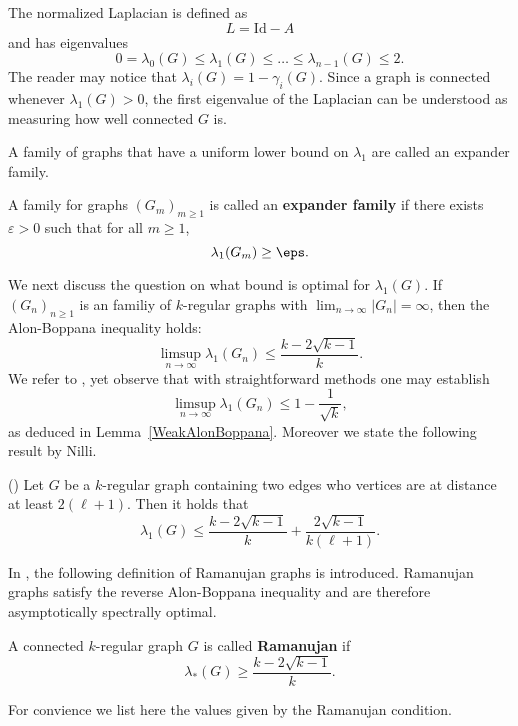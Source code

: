 The normalized Laplacian is defined as $$L = \mathrm{Id} - A$$ and has eigenvalues $$0 = \lambda_0(G) \leq \lambda_1(G) \leq \ldots \leq \lambda_{n-1}(G) \leq 2.$$ The reader may notice that $\lambda_i(G) = 1-\gamma_i(G)$. Since a graph is connected whenever $\lambda_1(G) > 0$, the first eigenvalue of the Laplacian can be understood as measuring how well connected $G$ is. 

A family of graphs that have a uniform lower bound on $\lambda_1$  are called an expander family.

\begin{definition}
	A family for graphs $(G_m)_{m \geq 1}$ is called an \textbf{expander family} if there exists $\varepsilon > 0$ such that for all $m \geq 1$, $$\lambda_1(G_m) \geq \eps.$$
\end{definition}

We next discuss the question on what bound is optimal for $\lambda_1(G)$. If $(G_n)_{n \geq 1}$ is an familiy of $k$-regular graphs with $\lim_{n \to \infty}|G_n| = \infty$, then the Alon-Boppana inequality holds: $$\limsup_{n \to \infty} \lambda_1(G_n) \leq \frac{k - 2\sqrt{k-1}}{k}.$$ We refer to \cite{HooryLinialWidgerson2006}, yet observe that with straightforward methods one may establish $$\limsup_{n \to \infty} \lambda_{1}(G_n) \leq 1 - \frac{1}{\sqrt{k}},$$ as deduced in Lemma~\ref{WeakAlonBoppana}. Moreover we state the following result by Nilli.

\begin{theorem}(\cite{Nilli1991})
	Let $G$ be a $k$-regular graph containing two edges who vertices are at distance at least $2(\ell + 1)$. Then it holds that $$\lambda_1(G) \leq \frac{k - 2\sqrt{k-1}}{k} + \frac{2\sqrt{k-1}}{k(\ell + 1)}.$$
\end{theorem}

In \cite{LubotzkyPhillipsSarnak1988}, the following definition of Ramanujan graphs is introduced. Ramanujan graphs satisfy the reverse Alon-Boppana inequality and are therefore asymptotically spectrally optimal. 

\begin{definition}\label{Ramanujan}
	A connected $k$-regular graph $G$ is called \textbf{Ramanujan} if $$\lambda_{*}(G) \geq \frac{k-2\sqrt{k-1}}{k}.$$ 
\end{definition}

For convience we list here the values given by the Ramanujan condition.

